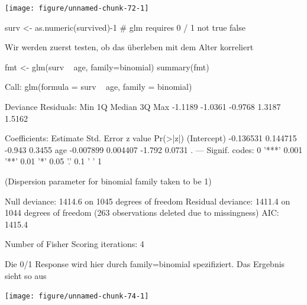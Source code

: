 \documentclass[a4paper,twoside]{tufte-book}\usepackage[]{graphicx}\usepackage[]{color}
\begin{document}
\begin{appendices}
\begin{Schunk}
\texttt{[image: figure/unnamed-chunk-72-1]} \begin{Sinput}
surv <- as.numeric(survived)-1 # glm requires 0 / 1 not true false
\end{Sinput}
\end{Schunk}


Wir werden zuerst testen, ob das überleben mit dem Alter korreliert

\begin{Schunk}
\begin{Sinput}
fmt <- glm(surv ~ age, family=binomial)
summary(fmt)
\end{Sinput}
\begin{Soutput}

Call:
glm(formula = surv ~ age, family = binomial)

Deviance Residuals: 
    Min       1Q   Median       3Q      Max  
-1.1189  -1.0361  -0.9768   1.3187   1.5162  

Coefficients:
             Estimate Std. Error z value Pr(>|z|)  
(Intercept) -0.136531   0.144715  -0.943   0.3455  
age         -0.007899   0.004407  -1.792   0.0731 .
---
Signif. codes:  0 '***' 0.001 '**' 0.01 '*' 0.05 '.' 0.1 ' ' 1

(Dispersion parameter for binomial family taken to be 1)

    Null deviance: 1414.6  on 1045  degrees of freedom
Residual deviance: 1411.4  on 1044  degrees of freedom
  (263 observations deleted due to missingness)
AIC: 1415.4

Number of Fisher Scoring iterations: 4
\end{Soutput}
\end{Schunk}

Die 0/1 Response wird hier durch  family=binomial spezifiziert. Das Ergebnis sieht so aus

\begin{Schunk}

\texttt{[image: figure/unnamed-chunk-74-1]} \end{Schunk}


\end{appendices}
\end{document}
